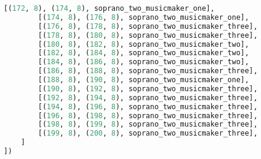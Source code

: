 \begin{lstlisting}[language=Python, caption=Invocation Source Code]
        [(172, 8), (174, 8), soprano_two_musicmaker_one],
        [(174, 8), (176, 8), soprano_two_musicmaker_one],
        [(176, 8), (178, 8), soprano_two_musicmaker_three],
        [(178, 8), (180, 8), soprano_two_musicmaker_three],
        [(180, 8), (182, 8), soprano_two_musicmaker_two],
        [(182, 8), (184, 8), soprano_two_musicmaker_two],
        [(184, 8), (186, 8), soprano_two_musicmaker_two],
        [(186, 8), (188, 8), soprano_two_musicmaker_three],
        [(188, 8), (190, 8), soprano_two_musicmaker_one],
        [(190, 8), (192, 8), soprano_two_musicmaker_three],
        [(192, 8), (194, 8), soprano_two_musicmaker_three],
        [(194, 8), (196, 8), soprano_two_musicmaker_three],
        [(196, 8), (198, 8), soprano_two_musicmaker_three],
        [(198, 8), (199, 8), soprano_two_musicmaker_three],
        [(199, 8), (200, 8), soprano_two_musicmaker_three],
    ]
])


\end{lstlisting}
